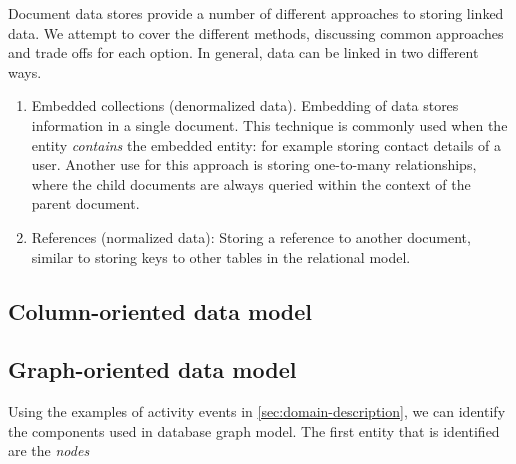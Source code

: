 



Document data stores provide a number of different approaches to storing linked data.
We attempt to cover the different methods, discussing common approaches and trade offs for each option.
In general, data can be linked in two different ways.

\begin{enumerate}
  \item Embedded collections (denormalized data).
        Embedding of data stores information in a single document.
        This technique is commonly used when the entity \textit{contains} the embedded entity: for example storing contact details of a user.
        Another use for this approach is storing one-to-many relationships, where the child documents are always queried within the context of the parent document.
  \item References (normalized data): Storing a reference to another document, similar to storing keys to other tables in the relational model.

\end{enumerate}

\subsection{Column-oriented data model}
\label{subsec:column-data-model}

\subsection{Graph-oriented data model}
\label{subsec:graph-data-model}

Using the examples of activity events in \cref{sec:domain-description}, we can identify the components used in database graph model.
The first entity that is identified are the \textit{nodes}



